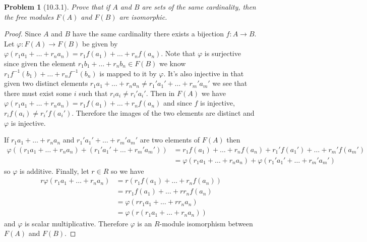\documentclass{article}
\newtheorem{problem}{Problem}
\begin{document}

\begin{problem}[10.3.1]
Prove that if $A$ and $B$ are sets of the same cardinality, then the free modules $F(A)$ and $F(B)$ are isomorphic.
\end{problem}
\begin{proof}
Since $A$ and $B$ have the same cardinality there exists a bijection $f : A \to B$. Let $\varphi : F(A) \to F(B)$ be given by $\varphi(r_1a_1 + \dots + r_na_n) = r_1f(a_1) + \dots + r_nf(a_n)$. Note that $\varphi$ is surjective since given the element $r_1b_1 + \dots + r_nb_n \in F(B)$ we know $r_1f^{-1}(b_1) + \dots + r_nf^{-1}(b_n)$ is mapped to it by $\varphi$. It's also injective in that given two distinct elements $r_1a_1 + \dots + r_na_n \neq r_1'a_1' + \dots + r_m'a_m'$ we see that there must exist some $i$ such that $r_ia_i \neq r_i'a_i'$. Then in $F(A)$ we have $\varphi(r_1a_1 + \dots + r_na_n) = r_1f(a_1) + \dots + r_nf(a_n)$ and since $f$ is injective, $r_if(a_i) \neq r_i'f(a_i')$. Therefore the images of the two elements are distinct and $\varphi$ is injective.

If $r_1a_1 + \dots + r_na_n$ and $r_1'a_1' + \dots + r_m'a_m'$ are two elements of $F(A)$ then
\begin{align*}
\varphi((r_1a_1 + \dots + r_na_n) + (r_1'a_1' + \dots + r_m'a_m'))
&= r_1f(a_1) + \dots + r_nf(a_n) + r_1'f(a_1') + \dots + r_m'f(a_m')\\
&= \varphi(r_1a_1 + \dots + r_na_n) + \varphi(r_1'a_1' + \dots + r_m'a_m')
\end{align*}
so $\varphi$ is additive. Finally, let $r \in R$ so we have
\begin{align*}
r\varphi(r_1a_1 + \dots + r_na_n)
&= r(r_1f(a_1) + \dots + r_nf(a_n))\\
&= rr_1f(a_1) + \dots + rr_nf(a_n)\\
&= \varphi(rr_1a_1 + \dots + rr_na_n)\\
&= \varphi(r(r_1a_1 + \dots + r_na_n))
\end{align*}
and $\varphi$ is scalar multiplicative. Therefore $\varphi$ is an $R$-module isomorphism between $F(A)$ and $F(B)$.
\end{proof}
\end{document}
